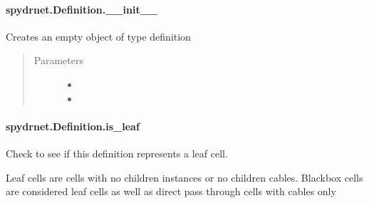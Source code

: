 \documentclass[letterpaper,10pt,english,openany,oneside]{sphinxmanual}
\begin{document}
\paragraph{spydrnet.Definition.\_\_init\_\_}
\label{\detokenize{reference/classes/generated/spydrnet.Definition.__init__:spydrnet-definition-init}}\label{\detokenize{reference/classes/generated/spydrnet.Definition.__init__::doc}}

\begin{fulllineitems}
\label{\detokenize{reference/classes/generated/spydrnet.Definition.__init__:spydrnet.Definition.__init__}}
Creates an empty object of type definition
\begin{quote}\begin{description}
\item[{Parameters}] \leavevmode\begin{itemize}
\item {} 

\item {} 

\end{itemize}

\end{description}\end{quote}

\end{fulllineitems}



\paragraph{spydrnet.Definition.is\_leaf}
\label{\detokenize{reference/classes/generated/spydrnet.Definition.is_leaf:spydrnet-definition-is-leaf}}\label{\detokenize{reference/classes/generated/spydrnet.Definition.is_leaf::doc}}

\begin{fulllineitems}
\label{\detokenize{reference/classes/generated/spydrnet.Definition.is_leaf:spydrnet.Definition.is_leaf}}
Check to see if this definition represents a leaf cell.

Leaf cells are cells with no children instances or no
children cables. Blackbox cells are considered leaf cells as well as direct pass through cells with cables only

\end{fulllineitems}
\end{document}
